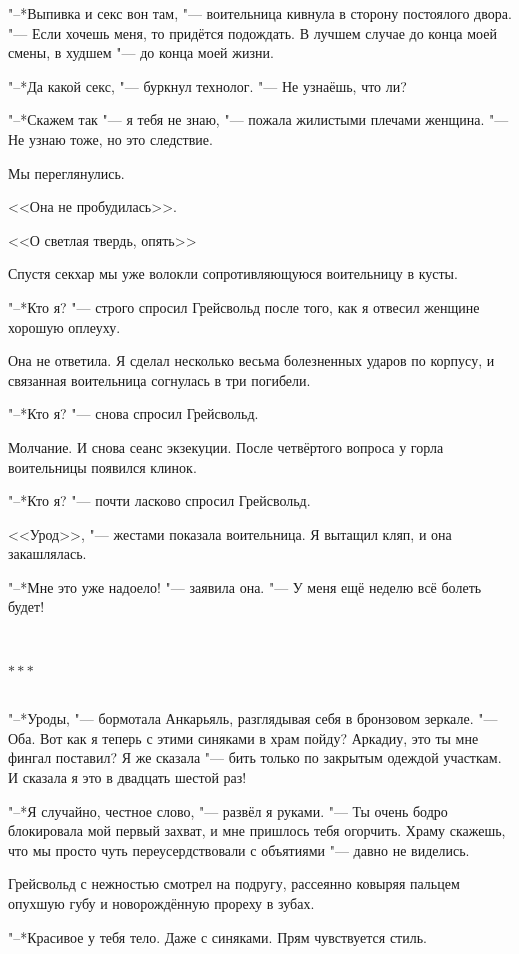 \documentclass[a4paper,10pt]{book}
\newcommand{\mulang}[3]{#2}%
\newcommand{\ldotst}{\so{...}\xspace}
\newcommand{\razd}{~\\{\centering\Large\bfseries$\ast \ast \ast$\par}~\\}
\begin{document}
"--*Выпивка и секс вон там, "--- воительница кивнула в сторону постоялого двора.
\mulang{}{"--- Если хочешь меня, то придётся подождать.}
{``If you want me, you have to wait.}
\mulang{}{В лучшем случае до конца моей смены, в худшем "--- до конца моей 
жизни.}
{At best, 'til the end of my shift; at worst, 'til the end of my life.''}

"--*Да какой секс, "--- буркнул технолог. "--- Не узнаёшь, что ли?

"--*Скажем так "--- я тебя не знаю, "--- пожала жилистыми плечами женщина. "--- 
Не узнаю тоже, но это следствие. 

Мы переглянулись.

<<Она не пробудилась>>.

<<О светлая твердь, опять\ldotst>>

Спустя секхар мы уже волокли сопротивляющуюся воительницу в кусты. 

"--*Кто я? "--- строго спросил Грейсвольд после того, как я отвесил женщине 
хорошую оплеуху.

Она не ответила. Я сделал несколько весьма болезненных ударов по корпусу, и 
связанная воительница согнулась в три погибели.

"--*Кто я? "--- снова спросил Грейсвольд.

Молчание. И снова сеанс экзекуции. После четвёртого вопроса у горла воительницы 
появился клинок.

"--*Кто я? "--- почти ласково спросил Грейсвольд.

<<Урод>>, "--- жестами показала воительница. Я вытащил кляп, и она закашлялась.

"--*Мне это уже надоело! "--- заявила она. "--- У меня ещё неделю всё болеть 
будет!

\razd

"--*Уроды, "--- бормотала Анкарьяль, разглядывая себя в бронзовом зеркале. "--- 
Оба.
Вот как я теперь с этими синяками в храм пойду? Аркадиу, это ты мне фингал 
поставил?
Я же сказала "--- бить только по закрытым одеждой участкам. И сказала я это в 
двадцать шестой раз!

"--*Я случайно, честное слово, "--- развёл я руками. "--- Ты очень бодро 
блокировала мой первый захват, и мне пришлось тебя огорчить. 
Храму скажешь, что мы просто чуть переусердствовали с
объятиями "--- давно не виделись.

Грейсвольд с нежностью смотрел на подругу, рассеянно ковыряя пальцем опухшую 
губу и новорождённую прореху в зубах.

"--*Красивое у тебя тело. Даже с синяками. Прям чувствуется стиль.
\end{document}
